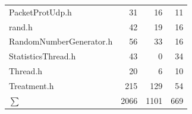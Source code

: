 \documentclass[../review_3.tex]{subfiles}
\begin{document}
\begin{longtable}[H]{p{10cm}rrr}
    PacketProtUdp.h         & 31           & 16            & 11            \\
    rand.h                  & 42           & 19            & 16            \\
    RandomNumberGenerator.h & 56           & 33            & 16            \\
    StatisticsThread.h      & 43           & 0             & 34            \\ %
    Thread.h                & 20           & 6             & 10            \\
    Treatment.h             & 215          & 129           & 54            \\ \midrule
    $\sum$                  & 2066         & 1101          & 669           \\ \bottomrule
\end{longtable}
\end{document}
